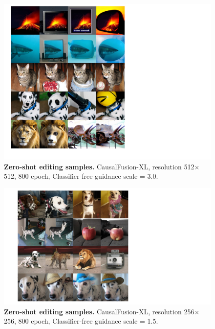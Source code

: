 \begin{figure}\centering
\includegraphics[width=\linewidth]{figs/edit512.pdf}
\caption{\textbf{Zero-shot editing samples.} CausalFusion-XL, resolution 512$\times$512, 800 epoch, Classifier-free guidance scale = 3.0.}
\label{fig:edit512}
\end{figure}

\begin{figure}\centering
\includegraphics[width=\linewidth]{figs/edit256.pdf}
\caption{\textbf{Zero-shot editing samples.} CausalFusion-XL, resolution 256$\times$256, 800 epoch, Classifier-free guidance scale = 1.5.}
\label{fig:edit256}
\end{figure}


